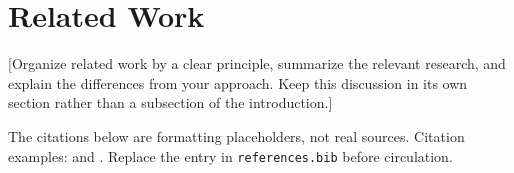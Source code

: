 \section{Related Work}\label{sec:related}
[Organize related work by a clear principle, summarize the relevant research,
and explain the differences from your approach. Keep this discussion in its
own section rather than a subsection of the introduction.]

The citations below are formatting placeholders, not real sources.
Citation examples: \citet{example-reference} and \citep{example-reference}.
Replace the entry in \texttt{references.bib} before circulation.
